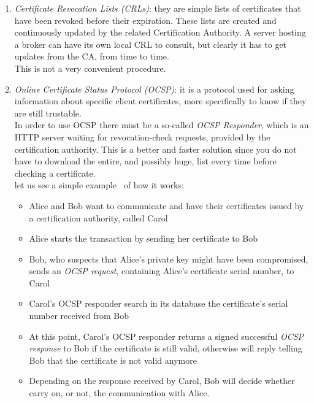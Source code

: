 \documentclass[12pt]{report}
\begin{document}
{\begin{itemize}
\begin{itemize}
\begin{enumerate}
\item \emph{Certificate Revocation Lists (CRLs)}: they are simple lists of certificates that have been revoked before their expiration.
These lists are created and continuously updated by the related Certification Authority.
A server hosting a broker can have its own local CRL to consult, but clearly it has to get updates from the CA, from time to time.\\
This is not a very convenient procedure.
\item \emph{Online Certificate Status Protocol (OCSP)}:  it is a protocol used for asking information about specific client certificates, more specifically to know if they are still trustable.\\
In order to use OCSP there must be a so-called \emph{OCSP Responder}, which is an HTTP server waiting for revocation-check requests, provided by the certification authority.
This is a better and faster solution since you do not have to download the entire, and possibly huge, list every time before checking a certificate.\\
let us see a simple example~\cite{ocspwiki} of how it works:

\begin{itemize}
\item Alice and Bob want to communicate and have their certificates issued by a certification authority, called Carol
\item Alice starts the transaction by sending her certificate to Bob 
\item Bob, who suspects that Alice's private key might have been compromised, sends an \emph{OCSP request}, containing Alice's certificate serial number, to Carol
\item Carol's OCSP responder search in its database the certificate's serial number received from Bob
\item At this point, Carol's OCSP responder returns a signed successful \emph{OCSP response} to Bob if the certificate is still valid, otherwise will reply telling Bob that the certificate is not valid anymore
\item Depending on the response received by Carol, Bob will decide whether carry on, or not, the communication with Alice.\\
\end{itemize}


\end{enumerate}
\end{itemize}
\end{itemize}


}
\end{document}
